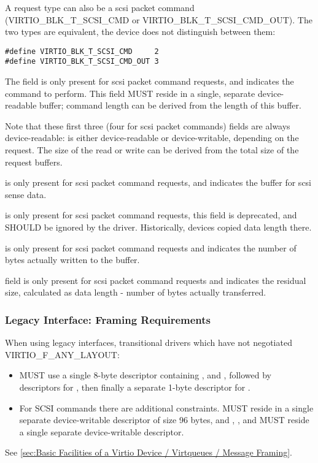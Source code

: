 A request type can also be a scsi packet command (VIRTIO_BLK_T_SCSI_CMD or
VIRTIO_BLK_T_SCSI_CMD_OUT).  The two types are equivalent, the device
does not distinguish between them:

\begin{lstlisting}
#define VIRTIO_BLK_T_SCSI_CMD     2
#define VIRTIO_BLK_T_SCSI_CMD_OUT 3
\end{lstlisting}

The  field is only present for scsi packet command requests,
and indicates the command to perform. This field MUST reside in a
single, separate device-readable buffer; command length can be derived
from the length of this buffer.

Note that these first three (four for scsi packet commands)
fields are always device-readable:  is either device-readable
or device-writable, depending on the request. The size of the read or
write can be derived from the total size of the request buffers.

 is only present for scsi packet command requests,
and indicates the buffer for scsi sense data.

 is only present for scsi packet command
requests, this field is deprecated, and SHOULD be ignored by the
driver. Historically, devices copied data length there.

 is only present for scsi packet command
requests and indicates the number of bytes actually written to
the  buffer.

 field is only present for scsi packet command
requests and indicates the residual size, calculated as data
length - number of bytes actually transferred.

\subsubsection{Legacy Interface: Framing Requirements}\label{sec:Device Types / Block Device / Legacy Interface: Framing Requirements}

When using legacy interfaces, transitional drivers which have not
negotiated VIRTIO_F_ANY_LAYOUT:

\begin{itemize}
\item MUST use a single 8-byte descriptor containing ,
   and , followed by descriptors
  for , then finally a separate 1-byte descriptor
  for .

\item For SCSI commands there are additional constraints.
   MUST reside in a
  single separate device-writable descriptor of size 96 bytes,
  and , ,  and
   MUST reside a single separate
  device-writable descriptor.
\end{itemize}

See \ref{sec:Basic Facilities of a Virtio Device / Virtqueues / Message Framing}.
